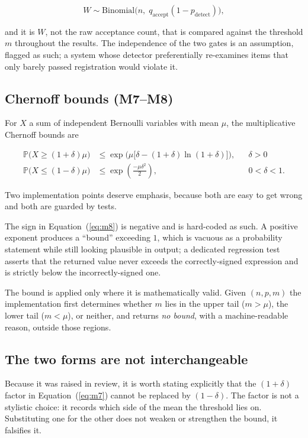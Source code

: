 \documentclass[11pt,a4paper]{article}
\newcommand{\Prob}{\mathbb{P}}
\newcommand{\Bin}{\mathrm{Binomial}}
\newcommand{\eqnref}[1]{Equation~(\ref{#1})}
\begin{document}
\begin{equation}
W \sim \Bin\big(n,\; q_{\text{accept}}(1 - p_{\text{detect}})\big),
\label{eq:survival}
\end{equation}

and it is $W$, not the raw acceptance count, that is compared against the threshold $m$
throughout the results. The independence of the two gates is an assumption, flagged as
such; a system whose detector preferentially re-examines items that only barely passed
registration would violate it.

\subsection{Chernoff bounds (M7--M8)}

For $X$ a sum of independent Bernoulli variables with mean $\mu$, the multiplicative
Chernoff bounds are

\begin{align}
\Prob\big(X \geq (1+\delta)\mu\big) &\leq
  \exp\!\Big(\mu\big[\delta - (1+\delta)\ln(1+\delta)\big]\Big),
  && \delta > 0 \label{eq:m7}\\[4pt]
\Prob\big(X \leq (1-\delta)\mu\big) &\leq
  \exp\!\left(\frac{-\mu\delta^{2}}{2}\right),
  && 0 < \delta < 1 . \label{eq:m8}
\end{align}

Two implementation points deserve emphasis, because both are easy to get
wrong and both are guarded by tests.

The sign in \eqnref{eq:m8} is negative and is hard-coded as such. A positive
exponent produces a ``bound'' exceeding $1$, which is vacuous as a probability
statement while still looking plausible in output; a dedicated regression test
asserts that the returned value never exceeds the correctly-signed expression
and is strictly below the incorrectly-signed one.

The bound is applied only where it is mathematically valid. Given $(n, p, m)$
the implementation first determines whether $m$ lies in the upper tail
($m > \mu$), the lower tail ($m < \mu$), or neither, and returns \emph{no
bound}, with a machine-readable reason, outside those regions.

\subsection{The two forms are not interchangeable}
\label{sec:tailforms}

Because it was raised in review, it is worth stating explicitly that the
$(1+\delta)$ factor in \eqnref{eq:m7} cannot be replaced by $(1-\delta)$.
The factor is not a stylistic choice: it records which side of the mean
the threshold lies on. Substituting one for the other does not weaken or
strengthen the bound, it falsifies it.
\end{document}

